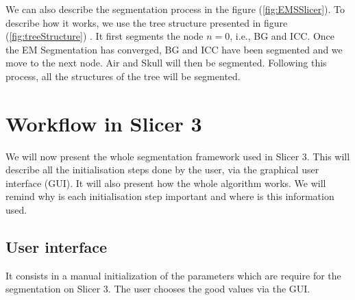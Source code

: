 We can also describe the segmentation process in the figure (\ref{fig:EMSSlicer}). To describe how it works, we use the tree structure presented in figure (\ref{fig:treeStructure}) . It first segments the node $n=0$, i.e., BG and ICC. Once the EM Segmentation has converged, BG and ICC have been segmented and we move to the next node. Air and Skull will then be segmented. Following this process, all the structures of the tree will be segmented.
%
\section{Workflow in Slicer 3}
We will now present the whole segmentation framework used in Slicer 3. This will describe all the initialisation steps done by the user, via the graphical user interface (GUI). It will also present how the whole algorithm works. We will remind why is each initialisation step important and where is this information used.
%
\subsection{User interface}\label{GUI}
It consists in a manual initialization of the parameters which are require for the segmentation on Slicer 3. The user chooses the good values via the GUI.

